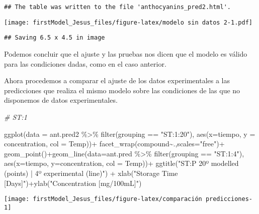 \documentclass[
]{article}
\newenvironment{Shaded}{\begin{snugshade}}{\end{snugshade}}
\newcommand{\AttributeTok}[1]{\textcolor[rgb]{0.77,0.63,0.00}{#1}}
\newcommand{\CommentTok}[1]{\textcolor[rgb]{0.56,0.35,0.01}{\textit{#1}}}
\newcommand{\FunctionTok}[1]{\textcolor[rgb]{0.00,0.00,0.00}{#1}}
\newcommand{\NormalTok}[1]{#1}
\newcommand{\SpecialCharTok}[1]{\textcolor[rgb]{0.00,0.00,0.00}{#1}}
\newcommand{\StringTok}[1]{\textcolor[rgb]{0.31,0.60,0.02}{#1}}
\begin{document}
\begin{verbatim}
## The table was written to the file 'anthocyanins_pred2.html'.
\end{verbatim}

\texttt{[image: firstModel\_Jesus\_files/figure-latex/modelo sin datos 2-1.pdf]}

\begin{verbatim}
## Saving 6.5 x 4.5 in image
\end{verbatim}

Podemos concluir que el ajuste y las pruebas nos dicen que el modelo es
válido para las condiciones dadas, como en el caso anterior.

Ahora procedemos a comparar el ajuste de los datos experimentales a las
predicciones que realiza el mismo modelo sobre las condiciones de las
que no disponemos de datos experimentales.

\begin{Shaded}
\begin{Highlighting}[]
\CommentTok{\# ST:1}

\FunctionTok{ggplot}\NormalTok{(}\AttributeTok{data =}\NormalTok{ ant.pred2 }\SpecialCharTok{\%\textgreater{}\%} \FunctionTok{filter}\NormalTok{(grouping }\SpecialCharTok{==} \StringTok{"ST:1:20"}\NormalTok{), }\FunctionTok{aes}\NormalTok{(}\AttributeTok{x=}\NormalTok{tiempo, }\AttributeTok{y =}\NormalTok{ concentration, }\AttributeTok{col =}\NormalTok{ Temp))}\SpecialCharTok{+}
       \FunctionTok{facet\_wrap}\NormalTok{(compound}\SpecialCharTok{\textasciitilde{}}\NormalTok{.,}\AttributeTok{scales=}\StringTok{"free"}\NormalTok{)}\SpecialCharTok{+}
       \FunctionTok{geom\_point}\NormalTok{()}\SpecialCharTok{+}\FunctionTok{geom\_line}\NormalTok{(}\AttributeTok{data=}\NormalTok{ant.pred }\SpecialCharTok{\%\textgreater{}\%} \FunctionTok{filter}\NormalTok{(grouping }\SpecialCharTok{==} \StringTok{"ST:1:4"}\NormalTok{), }\FunctionTok{aes}\NormalTok{(}\AttributeTok{x=}\NormalTok{tiempo, }\AttributeTok{y=}\NormalTok{concentration, }\AttributeTok{col =}\NormalTok{ Temp))}\SpecialCharTok{+}
  \FunctionTok{ggtitle}\NormalTok{(}\StringTok{"ST:P 20º modelled (points) | 4º experimental (line)"}\NormalTok{) }\SpecialCharTok{+} \FunctionTok{xlab}\NormalTok{(}\StringTok{"Storage Time [Days]"}\NormalTok{)}\SpecialCharTok{+}\FunctionTok{ylab}\NormalTok{(}\StringTok{"Concentration [mg/100mL]"}\NormalTok{)}
\end{Highlighting}
\end{Shaded}

\begin{center}\texttt{[image: firstModel\_Jesus\_files/figure-latex/comparación predicciones-1]} \end{center}
\end{document}
